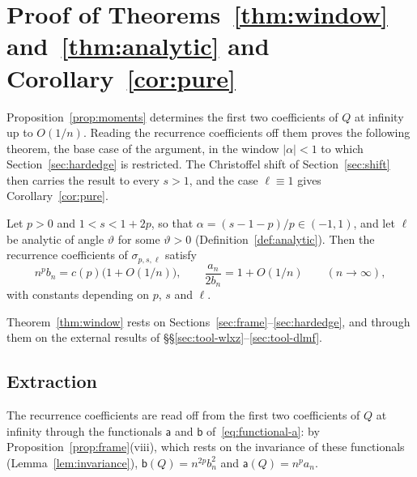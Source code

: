
\section{\texorpdfstring{Proof of Theorems~\ref{thm:window} and~\ref{thm:analytic} and Corollary~\ref{cor:pure}}{Proof of Theorems 7.1 and 1.2 and Corollary 1.3}}\label{sec:extraction}

Proposition~\ref{prop:moments} determines the first two coefficients of $Q$ at infinity up to $O(1/n)$. Reading the
recurrence coefficients off them proves the following theorem, the base case of the argument, in the window
$|\alpha|<1$ to which Section~\ref{sec:hardedge} is restricted. The Christoffel shift of Section~\ref{sec:shift} then carries the result to every $s>1$, and the case
$\ell\equiv1$ gives Corollary~\ref{cor:pure}.

\begin{theorem}\label{thm:window}
Let $p>0$ and $1<s<1+2p$, so that $\alpha=(s-1-p)/p\in(-1,1)$, and let $\ell$ be analytic of angle $\vartheta$ for some
$\vartheta>0$ (Definition~\ref{def:analytic}). Then the recurrence coefficients of $\sigma_{p,s,\ell}$ satisfy
\[
  n^pb_n=c(p)\bigl(1+O(1/n)\bigr),\qquad \frac{a_n}{2b_n}=1+O(1/n)\qquad(n\to\infty),
\]
with constants depending on $p$, $s$ and $\ell$.
\end{theorem}

Theorem~\ref{thm:window} rests on Sections~\ref{sec:frame}--\ref{sec:hardedge}, and through them on the external
results of \S\S\ref{sec:tool-wlxz}--\ref{sec:tool-dlmf}.

\subsection{Extraction}\label{sec:extraction-proof}

The recurrence coefficients are read off from the first two coefficients of $Q$ at infinity through the functionals
$\mathsf a$ and $\mathsf b$ of~\eqref{eq:functional-a}: by Proposition~\ref{prop:frame}(viii), which rests on the
invariance of these functionals (Lemma~\ref{lem:invariance}), $\mathsf b(Q)=n^{2p}b_n^2$ and $\mathsf a(Q)=n^pa_n$.

